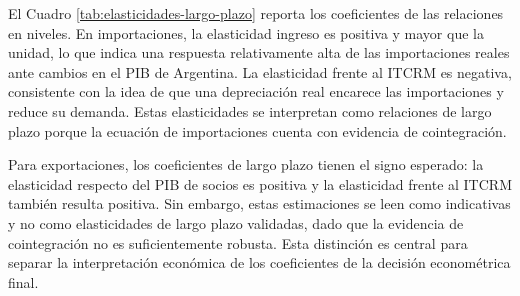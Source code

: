\documentclass[11pt]{article}
\begin{document}
\begin{table}[H]
\centering
\caption{Resultados de las pruebas de cointegración.}
\label{tab:pruebas-cointegracion}
\small
{}
\end{table}

El Cuadro \ref{tab:elasticidades-largo-plazo} reporta los coeficientes de las
relaciones en niveles. En importaciones, la elasticidad ingreso es positiva y
mayor que la unidad, lo que indica una respuesta relativamente alta de las
importaciones reales ante cambios en el PIB de Argentina. La elasticidad frente
al ITCRM es negativa, consistente con la idea de que una depreciación real
encarece las importaciones y reduce su demanda. Estas elasticidades se
interpretan como relaciones de largo plazo porque la ecuación de importaciones
cuenta con evidencia de cointegración.

Para exportaciones, los coeficientes de largo plazo tienen el signo esperado:
la elasticidad respecto del PIB de socios es positiva y la elasticidad frente
al ITCRM también resulta positiva. Sin embargo, estas estimaciones se leen como
indicativas y no como elasticidades de largo plazo validadas, dado que la
evidencia de cointegración no es suficientemente robusta. Esta distinción es
central para separar la interpretación económica de los coeficientes de la
decisión econométrica final.
\end{document}
